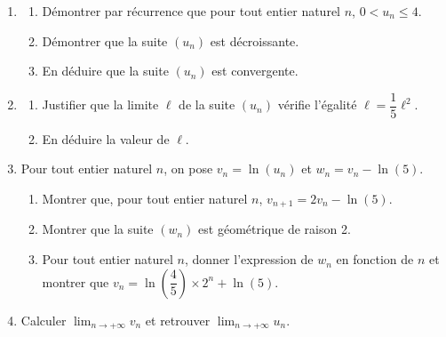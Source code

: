 \documentclass[10pt]{article}
\begin{document}
\begin{enumerate}
\begin{enumerate}
	\end{enumerate}
\item 
	\begin{enumerate}
		\item Démontrer par récurrence que pour tout entier naturel $n$,\: $0 < u_n \leqslant 4$.
		\item Démontrer que la suite $\left(u_n\right)$ est décroissante.
		\item En déduire que la suite $\left(u_n\right)$ est convergente.
	\end{enumerate}
\item 
	\begin{enumerate}
		\item Justifier que la limite $\ell$ de la suite $\left(u_n\right)$ vérifie l'égalité $\ell = \dfrac15 \ell^2$.
		\item En déduire la valeur de $\ell$.
	\end{enumerate}
\item Pour tout entier naturel $n$, on pose $v_n = \ln \left(u_n\right)$ et $w_n = v_n - \ln (5)$.
	\begin{enumerate}
		\item Montrer que, pour tout entier naturel $n$,\: $v_{n+1} = 2v_n - \ln (5)$.
		\item Montrer que la suite $\left(w_n\right)$ est géométrique de raison 2.
		\item Pour tout entier naturel $n$, donner l'expression de $w_n$ en fonction de $n$ et montrer que $v_n = \ln \left(\dfrac45 \right) \times 2^n + \ln (5)$.
	\end{enumerate}
\item Calculer $\displaystyle\lim_{n \to + \infty} v_n$ et retrouver $\displaystyle\lim_{n \to + \infty} u_n$.
\end{enumerate}

\bigskip
\end{document}
